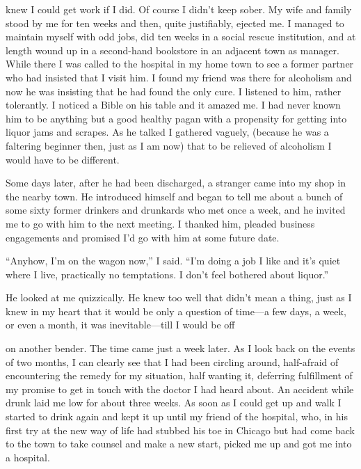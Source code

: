 \begin{biblechapter}
knew I could get work if I did. Of course I didn’t keep sober. My wife and family stood by me for ten weeks and then, quite justifiably, ejected me. I managed to maintain myself with odd jobs, did ten weeks in a social rescue institution, and at length wound up in a second-hand bookstore in an adjacent town as manager. While there I was called to the hospital in my home town to see a former partner who had insisted that I visit him. I found my friend was there for alcoholism and now he was insisting that he had found the only cure. I listened to him, rather tolerantly. I noticed a Bible on his table and it amazed me. I had never known him to be anything but a good healthy pagan with a propensity for getting into liquor jams and scrapes. As he talked I gathered vaguely, (because he was a faltering beginner then, just as I am now) that to be relieved of alcoholism I would have to be different.

Some days later, after he had been discharged, a stranger came into my shop in the nearby town. He introduced himself and began to tell me about a bunch of some sixty former drinkers and drunkards who met once a week, and he invited me to go with him to the next meeting. I thanked him, pleaded business engagements and promised I’d go with him at some future date.

“Anyhow, I’m on the wagon now,” I said. “I’m doing a job I like and it’s quiet where I live, practically no temptations. I don’t feel bothered about liquor.”

He looked at me quizzically. He knew too well that didn’t mean a thing, just as I knew in my heart that it would be only a question of time—a few days, a week, or even a month, it was inevitable—till I would be off

on another bender. The time came just a week later. As I look back on the events of two months, I can clearly see that I had been circling around, half-afraid of encountering the remedy for my situation, half wanting it, deferring fulfillment of my promise to get in touch with the doctor I had heard about. An accident while drunk laid me low for about three weeks. As soon as I could get up and walk I started to drink again and kept it up until my friend of the hospital, who, in his first try at the new way of life had stubbed his toe in Chicago but had come back to the town to take counsel and make a new start, picked me up and got me into a hospital.


\end{biblechapter}
